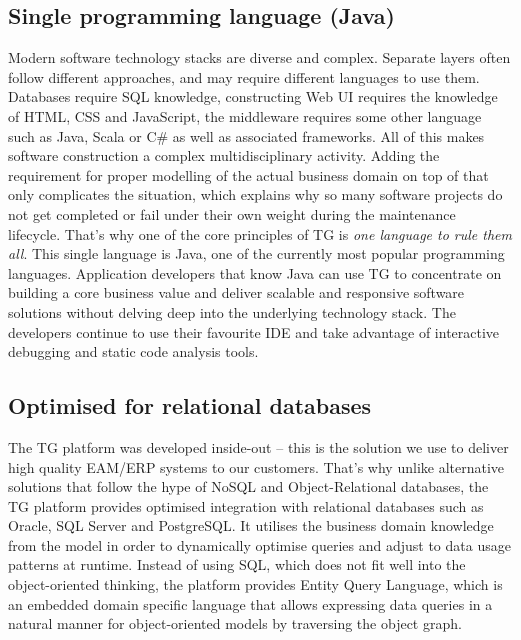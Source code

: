 \documentclass[a4paper,12pt,oneside,openright,final]{memoir} %
\begin{document}
\subsection*{Single programming language (Java)}
	Modern software technology stacks are diverse and complex.
	Separate layers often follow different approaches, and may require different languages to use them.
	Databases require SQL knowledge, constructing Web UI requires the knowledge of HTML, CSS and JavaScript, the middleware requires some other language such as Java, Scala or C\# as well as associated frameworks.
	All of this makes software construction a complex multidisciplinary activity.
	Adding the requirement for proper modelling of the actual business domain on top of that only complicates the situation, which explains why so many software projects do not get completed or fail under their own weight during the maintenance lifecycle.
	That's why one of the core principles of TG is \emph{one language to rule them all}.
	This single language is Java, one of the currently most popular programming languages.
	Application developers that know Java can use TG to concentrate on building a core business value and deliver scalable and responsive software solutions without delving deep into the underlying technology stack.
	The developers continue to use their favourite IDE and take advantage of interactive debugging and static code analysis tools.

\subsection*{Optimised for relational databases}
	The TG platform was developed inside-out -- this is the solution we use to deliver high quality EAM/ERP systems to our customers.
	That's why unlike alternative solutions that follow the hype of NoSQL and Object-Relational databases, the TG platform provides optimised integration with relational databases such as Oracle, SQL Server and PostgreSQL.
	It utilises the business domain knowledge from the model in order to dynamically optimise queries and adjust to data usage patterns at runtime.
	Instead of using SQL, which does not fit well into the object-oriented thinking, the platform provides Entity Query Language, which is an embedded domain specific language that allows expressing data queries in a natural manner for object-oriented models by traversing the object graph.
\end{document}
